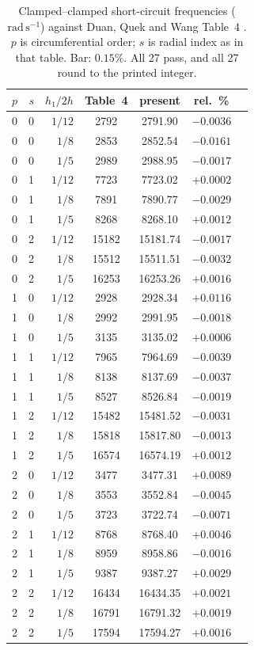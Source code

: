 \documentclass[11pt]{article}
\begin{document}
\begin{table}[H]
\centering
\caption{Clamped--clamped short-circuit frequencies ($\mathrm{rad\,s^{-1}}$)
against Duan, Quek and Wang Table~4 \cite{duan2005}. $p$ is
circumferential order; $s$ is radial index as in that table. Bar:
$0.15\%$. All 27 pass, and all 27 round to the printed integer.}
\label{tab:duan}
\small
\begin{tabular}{@{}rrrcccc@{}}
\toprule
$p$ & $s$ & $h_1/2h$ & Table~4 & present & rel.\ \% \\
\midrule
0 & 0 & $1/12$ & 2792 & 2791.90 & $-0.0036$ \\
0 & 0 & $1/8$  & 2853 & 2852.54 & $-0.0161$ \\
0 & 0 & $1/5$  & 2989 & 2988.95 & $-0.0017$ \\
0 & 1 & $1/12$ & 7723 & 7723.02 & $+0.0002$ \\
0 & 1 & $1/8$  & 7891 & 7890.77 & $-0.0029$ \\
0 & 1 & $1/5$  & 8268 & 8268.10 & $+0.0012$ \\
0 & 2 & $1/12$ & 15182 & 15181.74 & $-0.0017$ \\
0 & 2 & $1/8$  & 15512 & 15511.51 & $-0.0032$ \\
0 & 2 & $1/5$  & 16253 & 16253.26 & $+0.0016$ \\
1 & 0 & $1/12$ & 2928 & 2928.34 & $+0.0116$ \\
1 & 0 & $1/8$  & 2992 & 2991.95 & $-0.0018$ \\
1 & 0 & $1/5$  & 3135 & 3135.02 & $+0.0006$ \\
1 & 1 & $1/12$ & 7965 & 7964.69 & $-0.0039$ \\
1 & 1 & $1/8$  & 8138 & 8137.69 & $-0.0037$ \\
1 & 1 & $1/5$  & 8527 & 8526.84 & $-0.0019$ \\
1 & 2 & $1/12$ & 15482 & 15481.52 & $-0.0031$ \\
1 & 2 & $1/8$  & 15818 & 15817.80 & $-0.0013$ \\
1 & 2 & $1/5$  & 16574 & 16574.19 & $+0.0012$ \\
2 & 0 & $1/12$ & 3477 & 3477.31 & $+0.0089$ \\
2 & 0 & $1/8$  & 3553 & 3552.84 & $-0.0045$ \\
2 & 0 & $1/5$  & 3723 & 3722.74 & $-0.0071$ \\
2 & 1 & $1/12$ & 8768 & 8768.40 & $+0.0046$ \\
2 & 1 & $1/8$  & 8959 & 8958.86 & $-0.0016$ \\
2 & 1 & $1/5$  & 9387 & 9387.27 & $+0.0029$ \\
2 & 2 & $1/12$ & 16434 & 16434.35 & $+0.0021$ \\
2 & 2 & $1/8$  & 16791 & 16791.32 & $+0.0019$ \\
2 & 2 & $1/5$  & 17594 & 17594.27 & $+0.0016$ \\
\bottomrule
\end{tabular}
\end{table}
\end{document}
